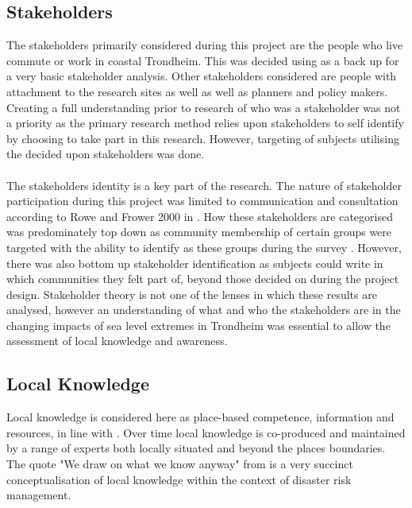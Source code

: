 \subsection{Stakeholders}
The stakeholders primarily considered during this project are the people who live commute or work in coastal Trondheim. This was decided using \cite{reed_stakeholder_nodate} as a back up for a very basic stakeholder analysis. Other stakeholders considered are people with attachment to the research sites as well as well as planners and policy makers. Creating a full understanding prior to research of who was a stakeholder was not a priority as the primary research method relies upon stakeholders to self identify by choosing to take part in this research. However, targeting of subjects utilising the decided upon stakeholders was done. 

\paragraph{}
The stakeholders identity is a key part of the research. The nature of stakeholder participation during this project was limited to communication and consultation according to Rowe and Frower 2000 in \cite{reed_stakeholder_nodate}. How these stakeholders are categorised was predominately top down as community membership of certain groups were targeted with the ability to identify as these groups during the survey \cite{reed_stakeholder_nodate}. However, there was also bottom up stakeholder identification as subjects could write in which communities they felt part of, beyond those decided on during the project design\cite{reed_stakeholder_nodate}. Stakeholder theory is not one of the lenses in which these results are analysed, however an understanding of what and who the stakeholders are in the changing impacts of sea level extremes in Trondheim was essential to allow the assessment of local knowledge and awareness. 

\subsection{Local Knowledge}

Local knowledge is considered here as place-based competence, information and resources, in line with \cite{setten_we_2019}. Over time local knowledge is co-produced and maintained by a range of experts both locally situated and beyond the places boundaries. The quote "We draw on what we know anyway" from \cite{setten_we_2019} is a very succinct conceptualisation of local knowledge within the context of disaster risk management.

